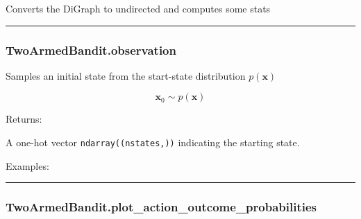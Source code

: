 \begin{Shaded}
\begin{Highlighting}[]
\NormalTok{)}
\end{Highlighting}
\end{Shaded}

Converts the DiGraph to undirected and computes some stats

\begin{center}\rule{0.5\linewidth}{\linethickness}\end{center}

\subsubsection{TwoArmedBandit.observation}\label{twoarmedbandit.observation}

\begin{Shaded}
\begin{Highlighting}[]
\NormalTok{)}
\end{Highlighting}
\end{Shaded}

Samples an initial state from the start-state distribution
\(p(\mathbf x)\)

\[
\mathbf x_0 \sim p(\mathbf x)
\]

Returns:

A one-hot vector \texttt{ndarray((nstates,))} indicating the starting
state.

Examples:

\begin{Shaded}
\begin{Highlighting}[]
\OperatorTok{=}
\end{Highlighting}
\end{Shaded}

\begin{center}\rule{0.5\linewidth}{\linethickness}\end{center}

\subsubsection{TwoArmedBandit.plot\_action\_outcome\_probabilities}\label{twoarmedbandit.plot_action_outcome_probabilities}

\begin{Shaded}
\begin{Highlighting}[]
\OperatorTok{=}\OperatorTok{=}\OperatorTok{=}\OperatorTok{=}\NormalTok{)}
\end{Highlighting}
\end{Shaded}

